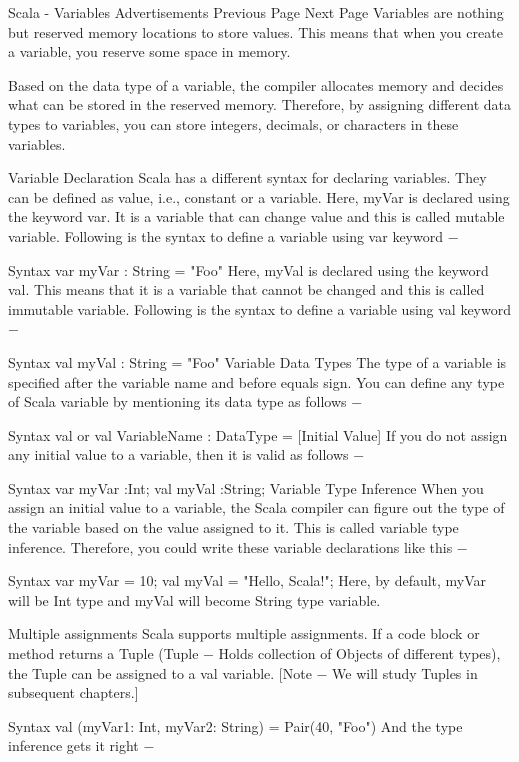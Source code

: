 Scala - Variables
Advertisements
 Previous Page Next Page  
Variables are nothing but reserved memory locations to store values. This means that when you create a variable, you reserve some space in memory.

Based on the data type of a variable, the compiler allocates memory and decides what can be stored in the reserved memory. Therefore, by assigning different data types to variables, you can store integers, decimals, or characters in these variables.

Variable Declaration
Scala has a different syntax for declaring variables. They can be defined as value, i.e., constant or a variable. Here, myVar is declared using the keyword var. It is a variable that can change value and this is called mutable variable. Following is the syntax to define a variable using var keyword −

Syntax
var myVar : String = "Foo"
Here, myVal is declared using the keyword val. This means that it is a variable that cannot be changed and this is called immutable variable. Following is the syntax to define a variable using val keyword −

Syntax
val myVal : String = "Foo"
Variable Data Types
The type of a variable is specified after the variable name and before equals sign. You can define any type of Scala variable by mentioning its data type as follows −

Syntax
val or val VariableName : DataType = [Initial Value]
If you do not assign any initial value to a variable, then it is valid as follows −

Syntax
var myVar :Int;
val myVal :String;
Variable Type Inference
When you assign an initial value to a variable, the Scala compiler can figure out the type of the variable based on the value assigned to it. This is called variable type inference. Therefore, you could write these variable declarations like this −

Syntax
var myVar = 10;
val myVal = "Hello, Scala!";
Here, by default, myVar will be Int type and myVal will become String type variable.

Multiple assignments
Scala supports multiple assignments. If a code block or method returns a Tuple (Tuple − Holds collection of Objects of different types), the Tuple can be assigned to a val variable. [Note − We will study Tuples in subsequent chapters.]

Syntax
val (myVar1: Int, myVar2: String) = Pair(40, "Foo")
And the type inference gets it right −

